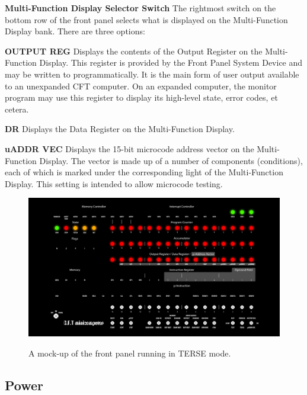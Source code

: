 \documentclass[11pt,a4paper,twocolumns]{article}
\newcommand{\sw}[1]{\textsf{#1}}
\begin{document}
\begin{description}
\item{\bf Multi-Function Display Selector Switch} The rightmost switch
  on the bottom row of the front panel selects what is displayed on
  the Multi-Function Display bank. There are three options:
  \begin{description}
  \item{\bf\sw{OUTPUT REG}} Displays the contents of the Output Register
    on the Multi-Function Display. This register is provided by the
    Front Panel System Device and may be written to
    programmatically. It is the main form of user output available to
    an unexpanded CFT computer. On an expanded computer, the monitor
    program may use this register to display its high-level state,
    error codes, et cetera.
  \item{\bf\sw{DR}} Displays the Data Register on the Multi-Function
    Display.
  \item{\bf\sw{uADDR VEC}} Displays the 15-bit microcode address
    vector on the Multi-Function Display. The vector is made up of a
    number of components (conditions), each of which is marked under
    the corresponding light of the Multi-Function Display. This
    setting is intended to allow microcode testing.
  \end{description}
\end{description}

\begin{figure}
\centering
\includegraphics[width=\columnwidth]{figs/front-panel-v2-terse-small.jpg}\\
\caption{\label{fig-panel-terse}A mock-up of the front panel running in \sw{TERSE} mode.}
\end{figure}

\subsection{Power}
\end{document}

